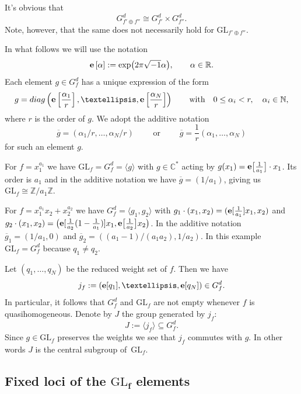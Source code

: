 \documentclass[10pt,a4paper]{article}
\numberwithin{equation}{section}
\newcommand{\CC}{{\mathbb{C}}}
\newcommand{\RR}{{\mathbb{R}}}
\newcommand{\ZZ}{{\mathbb{Z}}}
\newcommand{\NN}{{\mathbb{N}}}
\newcommand{\GL}{{\mathrm{GL}}}
\newcommand{\epi}{{\bf e}}
\begin{document}
It's obvious that
\begin{equation}\label{eq: full symmetry group of oplus}
	G_{f' \oplus f''}^d \cong G_{f'}^d \times G_{f''}^d.
\end{equation}
Note, however, that the same does not necessarily hold for $\GL_{f' \oplus f''}$.

In what follows we will use the notation
\[
\epi\left[\alpha\right] := \exp\bigl(2 \pi \sqrt{-1} \alpha\bigr), \qquad \alpha \in \RR.
\]
Each element $g\in G_f^d$ has a unique expression of the form
\begin{equation*}%
g={\rm diag}\left(\epi\left[\frac{\alpha_1}{r}\right], \dots,\epi\left[\frac{\alpha_N}{r}\right]\right)
\qquad \mbox{with}\quad 0 \leq \alpha_i < r,\quad \alpha_i\in\NN,
\end{equation*}
where $r$ is the order of $g$. We adopt the additive notation
\[
{\overline g = (\alpha_1/r,\dots, \alpha_N/r)} \qquad \text{ or } \qquad
{\overline g = \frac{1}{r}(\alpha_1,\dots, \alpha_N) }
\]
for such an element $g$.

\begin{Example}
For $f = x_1^{a_1}$	we have $\GL_f = G_f^d = \langle g \rangle $ with $g \in \CC^\ast$ acting by $g(x_1) = \epi\bigl[\frac{1}{a_1}\bigr] \cdot x_1$. Its order is $a_1$ and in the additive notation we have $\overline g = (1/a_1)$, giving us $\GL_f \cong \ZZ / a_1 \ZZ$.
\end{Example}
\begin{Example}\label{example: symmetry group chain2}
For $f = x_1^{a_1}x_2 + x_2^{a_2}$ we have $G_f^d = \langle g_1, g_2 \rangle$ with $g_1 \cdot (x_1,x_2) = (\epi[\frac{1}{a_1}] x_1, x_2)$ and ${ g_2 \cdot (x_1,x_2) = \bigl(\epi[\frac{1}{a_2}(1 - \frac{1}{a_1})]x_1, \epi\bigl[\frac{1}{a_2}\bigr]x_2\bigr)}$. In the additive notation $\overline g_1 = (1/a_1, 0)$ and $\overline g_2 = ((a_1 - 1)/(a_1a_2), 1/a_2)$.
In this example $\GL_f = G_f^d$ because $q_1 \neq q_2$.
\end{Example}

Let $(q_1,\dots,q_N)$ be the reduced weight set of $f$. Then we have
\[
	j_f:= (\epi[q_1],\dots, \epi[q_N]) \in G_f^d.
\]
In particular, it follows that $G_f^d$ and $\GL_f$ are not empty whenever $f$ is quasihomogeneous.
Denote by $J$ the group generated by $j_f$:
\[
	J := \langle j_f \rangle \subseteq G_f^d.
\]
Since $g\in \GL_f$ preserves the weights we see that $j_f$ commutes with $g$. In other words $J$ is the central subgroup of~$\GL_f$.

\subsection[Fixed loci of the GL\_f elements]{Fixed loci of the $\boldsymbol{\GL_f}$ elements}
\end{document}
